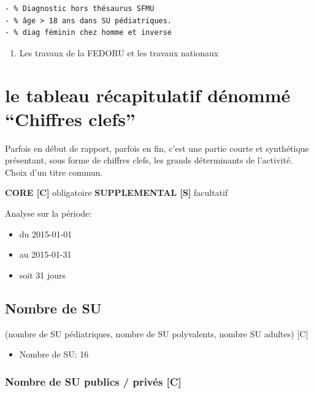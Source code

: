 \documentclass[]{article}
\begin{document}
\begin{verbatim}
- % Diagnostic hors thésaurus SFMU
- % âge > 18 ans dans SU pédiatriques.
- % diag féminin chez homme et inverse
\end{verbatim}

\begin{enumerate}
\def\labelenumi{\alph{enumi}.}
\setcounter{enumi}{3}
\itemsep1pt\parskip0pt
\item
  Les travaux de la FEDORU et les travaux nationaux
\end{enumerate}

\section{le tableau récapitulatif dénommé ``Chiffres
clefs''}\label{le-tableau-recapitulatif-denomme-chiffres-clefs}

Parfois en début de rapport, parfois en fin, c'est une partie courte et
synthétique présentant, sous forme de chiffres clefs, les grands
déterminants de l'activité. Choix d'un titre commun.

\textbf{CORE {[}C{]}} obligatoire \textbf{SUPPLEMENTAL {[}S{]}}
facultatif

Analyse sur la période:

\begin{itemize}
\itemsep1pt\parskip0pt
\item
  du 2015-01-01
\item
  au 2015-01-31
\item
  soit 31 jours
\end{itemize}

\subsection{Nombre de SU}\label{nombre-de-su}

(nombre de SU pédiatriques, nombre de SU polyvalents, nombre SU adultes)
{[}C{]}

\begin{itemize}
\itemsep1pt\parskip0pt
\item
  Nombre de SU: 16
\end{itemize}

\subsubsection{Nombre de SU publics / privés
{[}C{]}}\label{nombre-de-su-publics-prives-c}
\end{document}
